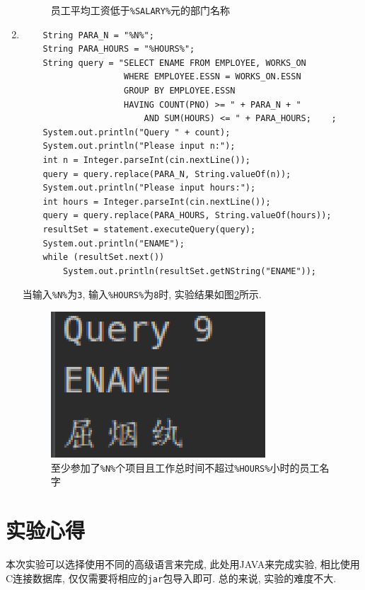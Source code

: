 \documentclass{ML}
\begin{document}
\begin{enumerate}
\begin{figure}[H]
    \caption{员工平均工资低于\texttt{\%SALARY\%}元的部门名称}\label{fig:3.8}
    \end{figure}
    \item \begin{verbatim}
    String PARA_N = "%N%";
    String PARA_HOURS = "%HOURS%";
    String query = "SELECT ENAME FROM EMPLOYEE, WORKS_ON 
                    WHERE EMPLOYEE.ESSN = WORKS_ON.ESSN 
                    GROUP BY EMPLOYEE.ESSN 
                    HAVING COUNT(PNO) >= " + PARA_N + " 
                        AND SUM(HOURS) <= " + PARA_HOURS;    ;
    System.out.println("Query " + count);
    System.out.println("Please input n:");
    int n = Integer.parseInt(cin.nextLine());
    query = query.replace(PARA_N, String.valueOf(n));
    System.out.println("Please input hours:");
    int hours = Integer.parseInt(cin.nextLine());
    query = query.replace(PARA_HOURS, String.valueOf(hours));
    resultSet = statement.executeQuery(query);
    System.out.println("ENAME");
    while (resultSet.next())
        System.out.println(resultSet.getNString("ENAME"));
    \end{verbatim}
    当输入\texttt{\%N\%}为\texttt{3}, 输入\texttt{\%HOURS\%}为\texttt{8}时, 实验结果如图\ref{fig:3.9}所示.
    \begin{figure}[H]
        \centering
        \includegraphics[scale = 0.5, bb=0 0 109 74]{media/3.9.eps}
        \caption{至少参加了\texttt{\%N\%}个项目且工作总时间不超过\texttt{\%HOURS\%}小时的员工名字}\label{fig:3.9}
    \end{figure}
\end{enumerate}
\section{实验心得}
本次实验可以选择使用不同的高级语言来完成, 此处用JAVA来完成实验, 相比使用C连接数据库, 仅仅需要将相应的\texttt{jar}包导入即可.
总的来说, 实验的难度不大.

\end{document}
